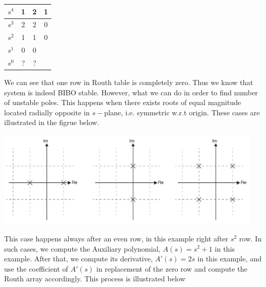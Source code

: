 \documentclass[twoside]{article}
\begin{document}
\begin{minipage}[h]{1\linewidth}
\begin{center}
\begin{tabular}{|c || c || c c |}
\hline
$s^4$ & 1 & 2 & 1 
\\ \hline
$s^3$ & 2 & 2 & 0
\\ \hline
$s^2$ & 1 & 1 & 0
\\ \hline
$s^1$ & 0 & 0 &
\\ \hline
$s^0$ & ? & ? & 
\\ \hline
\end{tabular}
\end{center}
\end{minipage}

We can see that one row in Routh table is completely zero. 
Thus we know that system is indeed BIBO stable. However,
what we can do in order to find number of unstable poles. 
This happens when there exists roots of equal magnitude
located radially opposite in $s-$plane, i.e. symmetric
w.r.t origin. These cases are illustrated in the figrue below.

\vspace{6pt}

\begin{minipage}[h]{1\linewidth}
    \begin{center}
      \includegraphics[width=0.95\textwidth]{caseII}
    \end{center}
\end{minipage}

\vspace{6pt}

This case happens always after an even row, in this example right after $s^2$ row. In such 
cases, we compute the Auxiliary polynomial, $A(s) = s^2 + 1$ in this
example. After that, we compute its derivative, $A'(s) = 2 s$ in this example,
and use the coefficient of $A'(s)$ in replacement of the zero row and compute
the Routh array accordingly. This process is illustrated below
\end{document}
